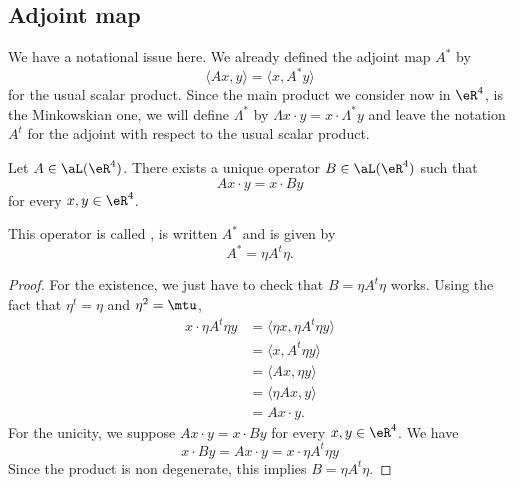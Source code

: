 \subsection{Adjoint map}

We have a notational issue here. We already defined the adjoint map \( A^*\) by
\begin{equation}
    \langle Ax, y\rangle =\langle x, A^*y\rangle 
\end{equation}
for the usual scalar product. Since the main product we consider now in \( \eR^4\), is the Minkowskian one, we will define \( \Lambda^*\) by \( \Lambda x\cdot y=x\cdot \Lambda^*y\) and leave the notation \( A^t\) for the adjoint with respect to the usual scalar product.

\begin{propositionDef}
    Let \( A\in \aL(\eR^4)\). There exists a unique operator \( B\in \aL(\eR^4)\) such that
    \begin{equation}
        Ax\cdot y=x\cdot By
    \end{equation}
    for every \( x,y\in\eR^4\).

    This operator is called , is written \( A^*\) and is given by
    \begin{equation}        \label{EQooPFPGooXiGcXs}
        A^*=\eta A^t\eta.
    \end{equation}
\end{propositionDef}

\begin{proof}
    For the existence, we just have to check that \( B=\eta A^t\eta\) works. Using the fact that \( \eta^t=\eta\) and \( \eta^2=\mtu\),
    \begin{subequations}
        \begin{align}
            x\cdot \eta A^t\eta y&=\langle \eta x, \eta A^t\eta y\rangle \\
            &=\langle x, A^t\eta y\rangle \\
            &=\langle Ax, \eta y\rangle \\
            &=\langle \eta Ax, y\rangle \\
            &=Ax\cdot y.
        \end{align}
    \end{subequations}
    For the unicity, we suppose $Ax\cdot y=x\cdot By$ for every \( x,y\in \eR^4\). We have
    \begin{equation}
        x\cdot By=Ax\cdot y=x\cdot \eta A^t\eta y
    \end{equation}
    Since the product is non degenerate, this implies \( B=\eta A^t\eta\).
\end{proof}

